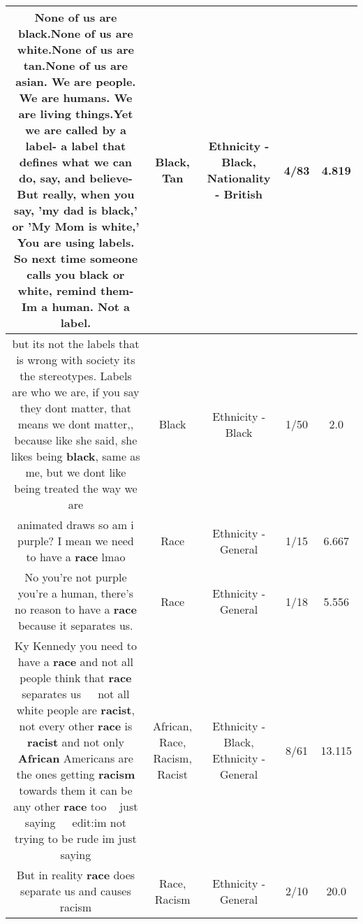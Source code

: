 \documentclass[11pt]{article}
\newlength\mylength
\begin{document}
\begin{center}
\begin{longtable}{|C{.65\mylength}|C{.30\mylength}|C{.12\mylength}|C{.12\mylength}|C{.12\mylength}|}
  \small None of us are \textbf{black}.None of us are white.None of us are \textbf{tan}.None of us are asian. We are people. We are humans. We are living things.Yet we are called by a label- a label that defines what we can do, say, and believe-But really, when you say, 'my dad is \textbf{black},' or 'My Mom is white,' You are using labels. So next time someone calls you \textbf{black} or white, remind them-Im a human. Not a label.\normalsize   & Black, Tan & Ethnicity - Black, Nationality - British & 4/83 & 4.819 \\  \hline
  \small but its not the labels that is wrong with society its the stereotypes. Labels are who we are, if you say they dont matter, that means we dont matter,, because like she said, she likes being \textbf{black}, same as me, but we dont like being treated the way we are\normalsize   & Black & Ethnicity - Black & 1/50 & 2.0 \\  \hline
  \small animated draws so am i purple? I mean we need to have a \textbf{race} lmao\normalsize   & Race & Ethnicity - General & 1/15 & 6.667 \\  \hline
  \small No you're not purple you're a human, there's no reason to have a \textbf{race} because it separates us.\normalsize   & Race & Ethnicity - General & 1/18 & 5.556 \\  \hline
  \small Ky Kennedy you need to have a \textbf{race} and not all people think that \textbf{race} separates us 🤦🏻‍♀️ not all white people are \textbf{racist}, not every other \textbf{race} is \textbf{racist} and not only \textbf{African} Americans are the ones getting \textbf{racism} towards them it can be any other \textbf{race} too🤦🏻‍♀️ just saying 🤷🏽‍♀️ edit:im not trying to be rude im just saying\normalsize   & African, Race, Racism, Racist & Ethnicity - Black, Ethnicity - General & 8/61 & 13.115 \\  \hline
  \small But in reality \textbf{race} does separate us and causes racism\normalsize   & Race, Racism & Ethnicity - General & 2/10 & 20.0 \\  \hline

\end{longtable}
\end{center}
\end{document}
